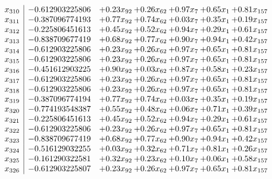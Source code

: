 \documentclass[8pt]{article}
\begin{document}
\[\begin{array}{c| c c@{\hskip 2pt} c@{\hskip 2pt} c@{\hskip 2pt} c@{\hskip 2pt} c@{\hskip 2pt} }
 x_{310}   &  -0.612903225806 & +  0.23 x_{92} & +  0.26 x_{62} & +  0.97 x_{7} & +  0.65 x_{1} & +  0.81 x_{157}\\
 x_{311}   &  -0.387096774193 & +  0.77 x_{92} & +  0.74 x_{62} & +  0.03 x_{7} & +  0.35 x_{1} & +  0.19 x_{157}\\
 x_{312}   &  -0.225806451613 & +  0.45 x_{92} & +  0.52 x_{62} & +  0.94 x_{7} & +  0.29 x_{1} & +  0.61 x_{157}\\
 x_{313}   &  -0.838709677419 & +  0.68 x_{92} & +  0.77 x_{62} & +  0.90 x_{7} & +  0.94 x_{1} & +  0.42 x_{157}\\
 x_{314}   &  -0.612903225806 & +  0.23 x_{92} & +  0.26 x_{62} & +  0.97 x_{7} & +  0.65 x_{1} & +  0.81 x_{157}\\
 x_{315}   &  -0.612903225806 & +  0.23 x_{92} & +  0.26 x_{62} & +  0.97 x_{7} & +  0.65 x_{1} & +  0.81 x_{157}\\
 x_{316}   &  -0.451612903225 & +  0.90 x_{92} & +  0.03 x_{62} & +  0.87 x_{7} & +  0.58 x_{1} & +  0.23 x_{157}\\
 x_{317}   &  -0.612903225806 & +  0.23 x_{92} & +  0.26 x_{62} & +  0.97 x_{7} & +  0.65 x_{1} & +  0.81 x_{157}\\
 x_{318}   &  -0.612903225806 & +  0.23 x_{92} & +  0.26 x_{62} & +  0.97 x_{7} & +  0.65 x_{1} & +  0.81 x_{157}\\
 x_{319}   &  -0.387096774194 & +  0.77 x_{92} & +  0.74 x_{62} & +  0.03 x_{7} & +  0.35 x_{1} & +  0.19 x_{157}\\
 x_{320}   &  -0.774193548387 & +  0.55 x_{92} & +  0.48 x_{62} & +  0.06 x_{7} & +  0.71 x_{1} & +  0.39 x_{157}\\
 x_{321}   &  -0.225806451613 & +  0.45 x_{92} & +  0.52 x_{62} & +  0.94 x_{7} & +  0.29 x_{1} & +  0.61 x_{157}\\
 x_{322}   &  -0.612903225806 & +  0.23 x_{92} & +  0.26 x_{62} & +  0.97 x_{7} & +  0.65 x_{1} & +  0.81 x_{157}\\
 x_{323}   &  -0.838709677419 & +  0.68 x_{92} & +  0.77 x_{62} & +  0.90 x_{7} & +  0.94 x_{1} & +  0.42 x_{157}\\
 x_{324}   &  -0.516129032255 & +  0.03 x_{92} & +  0.32 x_{62} & +  0.71 x_{7} & +  0.81 x_{1} & +  0.26 x_{157}\\
 x_{325}   &  -0.161290322581 & +  0.32 x_{92} & +  0.23 x_{62} & +  0.10 x_{7} & +  0.06 x_{1} & +  0.58 x_{157}\\
 x_{326}   &  -0.612903225807 & +  0.23 x_{92} & +  0.26 x_{62} & +  0.97 x_{7} & +  0.65 x_{1} & +  0.81 x_{157}\\

\end{array}\]
\end{document}
